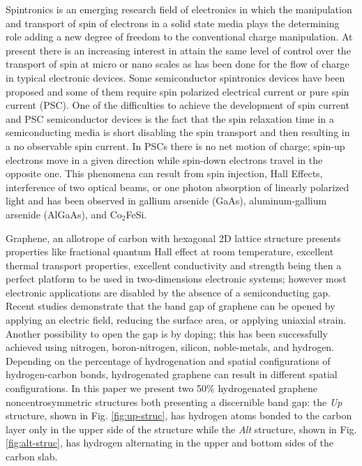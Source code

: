 \documentclass[prb,11pt,tightenlines,twocolumn,aps]{revtex4-1}
\begin{document}
Spintronics is an emerging research field of electronics in which the
manipulation and transport of spin of electrons in a solid state 
media plays the determining role adding a new degree of freedom to the
conventional charge manipulation.\cite{wolfSC04,fabianAPS07}
% 
At present there is an increasing interest in attain the same level of control
over the transport of spin at micro or nano scales as has been done for the
flow of charge in typical electronic devices.\cite{awschalomNP2007} Some
semiconductor spintronics devices have been proposed \cite{majumdarAPL06,
dattaAPL90,gotteNat16,pershinPRB08} and some of them require spin polarized
electrical current \cite{awschalomSSBM13} or pure spin current (PSC).
% 
One of the difficulties to achieve the development of spin current and PSC
semiconductor devices is the fact that the spin relaxation time in a
semiconducting media is short disabling the spin transport and then resulting
in a no observable spin current.\cite{murakamiSc03}
% 
In PSCs there is no net
motion of charge; spin-up electrons move in a given direction while spin-down
electrons travel in the opposite one. This phenomena can result from spin
injection,\cite{malPRB03} Hall Effects,\cite{sinovaPRB04} interference of two
optical beams,\cite{bhatPRL00, najmaiePRB03} or one photon absorption of
linearly polarized light\cite{bhatPRL05} and has been observed in gallium
arsenide (GaAs),\cite{zhaoPRL2006, stevensPRL03} aluminum-gallium arsenide
(AlGaAs),\cite{stevensPRL03} and Co$_2$FeSi.\cite{kimuraNGPAM12}

Graphene, an allotrope of carbon with hexagonal 2D lattice structure presents
properties like fractional quantum Hall effect at room temperature, excellent
thermal transport properties, excellent conductivity\cite{heerscheNat07} and
strength \cite{geimNM07, reinaNL08, novoselov2S07, balandinNL08} being then a
perfect platform to be used in two-dimensions electronic systems; however most
electronic applications are disabled by the absence of a semiconducting gap.
Recent studies demonstrate that the band gap of graphene can be opened by
applying an electric field,\cite{zhangN09} reducing the surface
area,\cite{hanPRL07} or applying uniaxial strain.\cite{niACSN08} Another
possibility to open the gap is by doping; this has been successfully achieved
using nitrogen,\cite{weiNL2009} boron-nitrogen,\cite{guoIJ11}
silicon,\cite{colettiPRB10} noble-metals,\cite{varykhalovPRB10} and
hydrogen.\cite{eliasS09, guisingerNL09, samarakoonACSN10}
% 
Depending on the percentage of hydrogenation and spatial configurations of
hydrogen-carbon bonds, hydrogenated graphene can result in different spatial
configurations.
% 
In this paper we present two 50\% hydrogenated graphene noncentrosymmetric
structures both presenting a discernible band gap: the \emph{Up} structure,
shown in Fig. \ref{fig:up-struc}, has hydrogen atoms bonded to the carbon layer
only in the upper side of the structure while the \emph{Alt} structure, shown
in Fig. \ref{fig:alt-struc}, has hydrogen alternating in the upper and bottom
sides of the carbon slab.\cite{zapataPSB2016}
\end{document}
